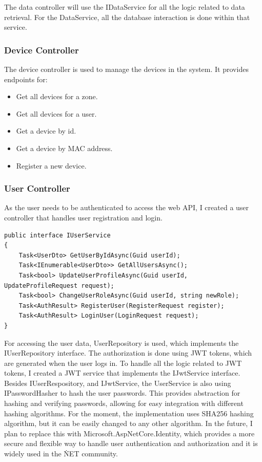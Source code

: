 The data controller will use the IDataService for all the logic related to data retrieval.
For the DataService, all the database interaction is done within that service.

\subsubsection{Device Controller}
The device controller is used to manage the devices in the system.
It provides endpoints for:
\begin{itemize}
    \item Get all devices for a zone.
    \item Get all devices for a user.
    \item Get a device by id.
    \item Get a device by MAC address.
    \item Register a new device.
\end{itemize}
\subsubsection{User Controller}
As the user needs to be authenticated to access the web API,
I created a user controller that handles user registration and login.

\begin{lstlisting}[caption={User Service interface}]
public interface IUserService
{
    Task<UserDto> GetUserByIdAsync(Guid userId);
    Task<IEnumerable<UserDto>> GetAllUsersAsync();
    Task<bool> UpdateUserProfileAsync(Guid userId, UpdateProfileRequest request);
    Task<bool> ChangeUserRoleAsync(Guid userId, string newRole);
    Task<AuthResult> RegisterUser(RegisterRequest register);
    Task<AuthResult> LoginUser(LoginRequest request);
}
\end{lstlisting}

For accessing the user data, UserRepository is used, which implements the IUserRepository interface.
The authorization is done using JWT tokens, 
which are generated when the user logs in. To handle all the logic related to 
JWT tokens, I created a JWT service that implements the IJwtService interface.
Besides IUserRespository, and IJwtService, the UserService is also using
IPasswordHasher to hash the user passwords. This provides abstraction
for hashing and verifying passwords, 
allowing for easy integration with different hashing algorithms. For the moment,
the implementation uses SHA256 hashing algorithm, 
but it can be easily changed to any other algorithm. In the future, I plan to replace
this with Microsoft.AspNetCore.Identity, 
which provides a more secure and flexible way to handle user 
authentication and authorization and it is widely used in the \.NET community.

